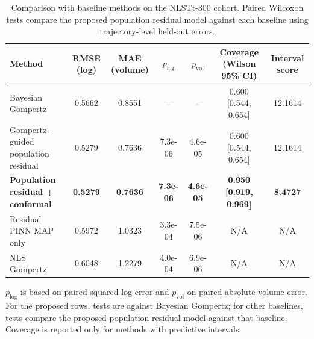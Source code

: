 \begin{table}[t]
\centering
\caption{Comparison with baseline methods on the NLSTt-300 cohort. Paired Wilcoxon tests compare the proposed population residual model against each baseline using trajectory-level held-out errors.}
\label{tab:method_comparison_stats}
\begin{tabular}{lcccccc}
\toprule
Method & RMSE (log) & MAE (volume) & $p_{\mathrm{log}}$ & $p_{\mathrm{vol}}$ & Coverage (Wilson 95\% CI) & Interval score \\
\midrule
Bayesian Gompertz & 0.5662 & 0.8551 & -- & -- & 0.600 [0.544, 0.654] & 12.1614 \\
Gompertz-guided population residual & 0.5279 & 0.7636 & 7.3e-06 & 4.6e-05 & 0.600 [0.544, 0.654] & 12.1614 \\
\textbf{Population residual + conformal} & \textbf{0.5279} & \textbf{0.7636} & \textbf{7.3e-06} & \textbf{4.6e-05} & \textbf{0.950 [0.919, 0.969]} & \textbf{8.4727} \\
Residual PINN MAP only & 0.5972 & 1.0323 & 3.3e-04 & 7.5e-06 & N/A & N/A \\
NLS Gompertz & 0.6048 & 1.2279 & 4.0e-04 & 6.9e-06 & N/A & N/A \\
\bottomrule
\end{tabular}
\vspace{1mm}
\footnotesize{$p_{\mathrm{log}}$ is based on paired squared log-error and $p_{\mathrm{vol}}$ on paired absolute volume error. For the proposed rows, tests are against Bayesian Gompertz; for other baselines, tests compare the proposed population residual model against that baseline. Coverage is reported only for methods with predictive intervals.}
\end{table}
